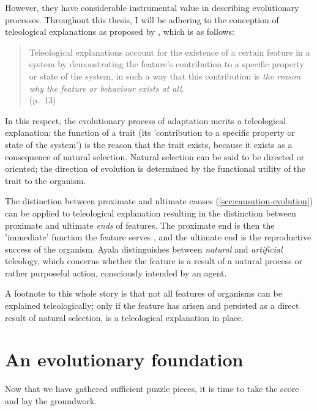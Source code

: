 However, they have considerable instrumental value in describing evolutionary processes. Throughout this thesis, I will be adhering to the conception of teleological explanations as proposed by \citet{Ayala99}, which is as follows:
\begin{quote}
    Teleological explanations account for the existence of a certain feature in a system by demonstrating the feature’s contribution to a specific property or state of the system, in such a way that this contribution is \emph{the reason why the feature or behaviour exists at all}.
    \\ \hfill
    (p.~13)
\end{quote}
In this respect, the evolutionary process of adaptation merits a teleological explanation; the function of a trait (its 'contribution to a specific property or state of the system') is the reason that the trait exists, because it exists as a consequence of natural selection.
Natural selection can be said to be directed or oriented; the direction of evolution is determined by the functional utility of the trait to the organism.

The distinction between proximate and ultimate causes (\cref{sec:causation-evolution}) can be applied to teleological explanation resulting in the distinction between proximate and ultimate \emph{ends} of features. The proximate end is then the 'immediate' function the feature serves , and the ultimate end is the reproductive success of the organism.
 Ayala distinguishes between \emph{natural} and \emph{artificial} teleology, which concerns whether the feature is a result of a natural process or rather purposeful action, consciously intended by an agent.

A footnote to this whole story is that not all features of organisms can be explained teleologically; only if the feature has arisen and persisted as a direct result of natural selection, is a teleological explanation in place.

\section{An evolutionary foundation}

Now that we have gathered sufficient puzzle pieces, it is time to take the score and lay the groundwork.
